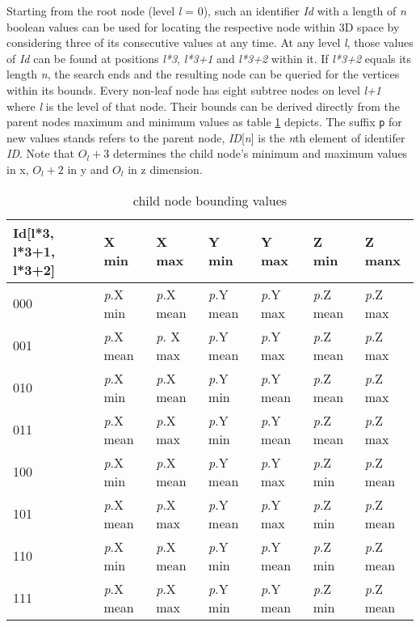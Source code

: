 Starting from the root node (level \textit{l} = 0), such an identifier \textit{Id} with a length of \textit{n} boolean values can be used for locating the respective node within 3D space by considering three of its consecutive values at any time. At any level \textit{l}, those  values of \textit{Id} can be found at positions \textit{l*3}, \textit{l*3+1} and \textit{l*3+2} within it. If \textit{l*3+2} equals its length \textit{n}, the search ends and the resulting node can be queried for the vertices within its bounds. Every non-leaf node has eight subtree nodes on level \textit{l+1} where \textit{l} is the level of that node. Their bounds can be derived directly from the parent nodes maximum and minimum values as table \ref{tab:child_node_bounding_values} depicts. The suffix \texttt{p} for new values stands refers to the parent node, \textit{ID}[\textit{n}] is the \textit{n}th element of identifer \textit{ID}. Note that \texttt{$O_l+3$} determines the child node's minimum and maximum values in x, \texttt{$O_l+2$} in y and \texttt{$O_l$} in z dimension.

\begin{table}[]
\begin{tabular}{l|llllll}
Id{[}l*3, l*3+1, l*3+2{]} & X min & X max & Y min & Y max & Z min & Z manx \\ \hline
000 & \textit{p}.X min & \textit{p}.X mean & \textit{p}.Y mean & \textit{p}.Y max & \textit{p}.Z mean & \textit{p}.Z max \\
001 & \textit{p}.X mean & \textit{p}. X max & \textit{p}.Y mean & \textit{p}.Y max & \textit{p}.Z mean & \textit{p}.Z max \\
010 & \textit{p}.X min & \textit{p}.X mean & \textit{p}.Y min & \textit{p}.Y mean & \textit{p}.Z mean & \textit{p}.Z max \\
011 & \textit{p}.X mean & \textit{p}.X max & \textit{p}.Y min & \textit{p}.Y mean & \textit{p}.Z mean & \textit{p}.Z max \\
100 & \textit{p}.X min & \textit{p}.X mean & \textit{p}.Y mean & \textit{p}.Y max & \textit{p}.Z min & \textit{p}.Z mean \\
101 & \textit{p}.X mean & \textit{p}.X max & \textit{p}.Y mean & \textit{p}.Y max & \textit{p}.Z min & \textit{p}.Z mean \\
110 & \textit{p}.X min & \textit{p}.X mean & \textit{p}.Y min & \textit{p}.Y mean & \textit{p}.Z min & \textit{p}.Z mean \\
111 & \textit{p}.X mean & \textit{p}.X max & \textit{p}.Y min & \textit{p}.Y mean & \textit{p}.Z min & \textit{p}.Z mean
\end{tabular}
\caption{child node bounding values}\label{tab:child_node_bounding_values}
\end{table}


